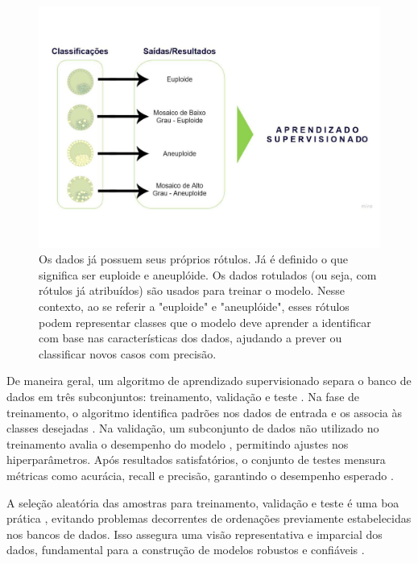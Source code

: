 \begin{figure}[h]
    \captionsetup{font=footnotesize, position=above}
    \label{fig:biopsiaPGT-A}
    \centering
    \includegraphics[scale=0.4]{figuras/aprendizadoSuper.pdf}
    \vspace{0.3cm} 
    \caption{Os dados já possuem seus próprios rótulos. Já é definido o que significa ser euploide e aneuplóide. Os dados rotulados (ou seja, com rótulos já atribuídos) são usados para treinar o modelo. Nesse contexto, ao se referir a "euploide" e "aneuplóide", esses rótulos podem representar classes que o modelo deve aprender a identificar com base nas características dos dados, ajudando a prever ou classificar novos casos com precisão.}
\end{figure}
\FloatBarrier

De maneira geral, um algoritmo de aprendizado supervisionado separa o banco de dados em três subconjuntos: treinamento, validação e teste \cite{izbicki2020}. Na fase de treinamento, o algoritmo identifica padrões nos dados de entrada e os associa às classes desejadas \cite{izbicki2020}. Na validação, um subconjunto de dados não utilizado no treinamento avalia o desempenho do modelo \cite{izbicki2020}, permitindo ajustes nos hiperparâmetros. Após resultados satisfatórios, o conjunto de testes mensura métricas como acurácia, recall e precisão, garantindo o desempenho esperado \cite{izbicki2020}.

A seleção aleatória das amostras para treinamento, validação e teste é uma boa prática \cite{izbicki2020}, evitando problemas decorrentes de ordenações previamente estabelecidas nos bancos de dados. Isso assegura uma visão representativa e imparcial dos dados, fundamental para a construção de modelos robustos e confiáveis \cite{izbicki2020}.

